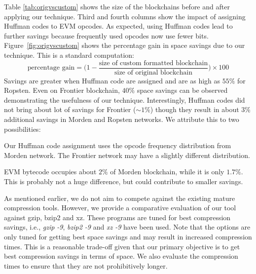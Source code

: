 \FloatBarrier
Table \ref{tab:origvscustom} shows the size of the blockchains before and after applying our technique. Third and fourth columns show the impact of assigning Huffman codes to EVM opcodes. 
As expected, using Huffman codes lead to further savings because frequently
used opcodes now use fewer bits.
Figure~\ref{fig:origvscustom} shows the percentage gain in space savings due to our technique. This is a standard computation:
\[ 
	\text{percentage gain} = \big ( 1 - \frac{\text{size of custom formatted blockchain}}{\text{size of original blockchain}}\big ) \times 100
\]
Savings are greater when Huffman code are assigned and are as high as $55\%$ for Ropsten. Even on Frontier blockchain, $40\%$ space savings can be observed demonstrating the usefulness of our technique. 
Interestingly, Huffman codes did not bring about lot of savings for Frontier ($\sim1\%$) though they result in about $3\%$ additional savings in Morden and Ropsten networks.
We attribute this to two possibilities:
\begin{enumerate*}
	\item Our Huffman code assignment uses the opcode frequency distribution from Morden network. The Frontier network may have a slightly different distribution.
	\item EVM bytecode occupies about $2\%$ of Morden blockchain, while it is only $1.7\%$. This is probably not a huge difference, but could contribute to smaller savings.
\end{enumerate*}


As mentioned earlier, we do not aim to compete against the existing mature compression tools.
However, we provide a comparative evaluation of our tool against gzip, bzip2 and xz. 
These programs are tuned for best compression savings, i.e., \emph{gzip -9}, \emph{bzip2 -9} and \emph{xz -9} have been used. 
Note that the options are only tuned for getting best space savings and may result in increased compression times.
This is a reasonable trade-off given that our primary objective is to get best compression savings in terms of space.
We also evaluate the compression times to ensure that they are not
prohibitively longer.

